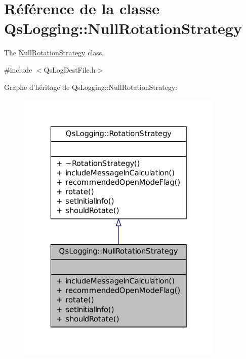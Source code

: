 \hypertarget{classQsLogging_1_1NullRotationStrategy}{\section{Référence de la classe Qs\-Logging\-:\-:Null\-Rotation\-Strategy}
\label{classQsLogging_1_1NullRotationStrategy}
}


The \hyperlink{classQsLogging_1_1NullRotationStrategy}{Null\-Rotation\-Strategy} class.  




{\ttfamily \#include $<$Qs\-Log\-Dest\-File.\-h$>$}



Graphe d'héritage de Qs\-Logging\-:\-:Null\-Rotation\-Strategy\-:
\nopagebreak
\begin{figure}[H]
\begin{center}
\leavevmode
\includegraphics[width=280pt]{classQsLogging_1_1NullRotationStrategy__inherit__graph}
\end{center}
\end{figure}


